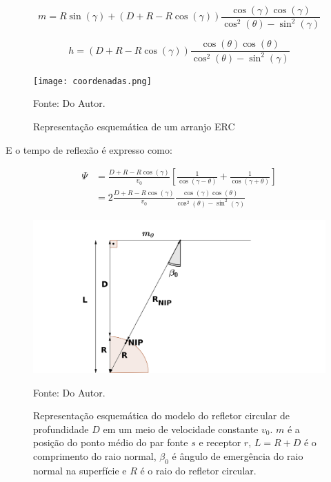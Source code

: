 \begin{equation}
\label{eq:7.1}
 m=R\sin(\gamma)+(D+R-R\cos(\gamma))\frac{\cos(\gamma)\cos(\gamma)}{\cos^2(\theta)-\sin^2(\gamma)}
\end{equation}

\begin{equation}
\label{eq:7.2}
 h=(D+R-R\cos(\gamma))\frac{\cos(\theta)\cos(\theta)}{\cos^2(\theta)-\sin^2(\gamma)}
\end{equation}

\begin{figure}[htb]
\caption{Representação esquemática de um arranjo ERC }
\begin{center}
\texttt{[image: coordenadas.png]}
\vspace{-0.3cm}
\end{center}
\begin{center}
 Fonte: Do Autor.
\end{center}
\label{fig:7.2}
\end{figure}


E o tempo de reflexão é expresso como:

\begin{equation}
\begin{flalign*}
\label{eq:7.3}
 \Psi &=\frac{D+R-R\cos(\gamma)}{v_0} \left[ \frac{1}{\cos(\gamma-\theta)}+\frac{1}{\cos(\gamma+\theta)} \right] \\
 &=2\frac{D+R-R\cos(\gamma)}{v_0}\frac{\cos(\gamma)\cos(\theta)}{\cos^2(\theta)-\sin^2(\gamma)}
\end{flalign*} 
\end{equation}


\begin{figure}[htb]
\caption{Representação esquemática do modelo do refletor circular de profundidade $D$
em um meio de velocidade constante $v_0$.
$m$ é a posição do ponto médio do par fonte $s$ e receptor $r$, $L=R+D$ é o comprimento do raio normal, 
$\beta_0$ é ângulo de emergência
do raio normal na superfície e $R$ é o raio do refletor circular.}
\begin{flushleft}
\includegraphics[scale=0.45]{images/circ_mod.png}
\vspace{-0.3cm}
\end{flushleft}
\begin{center}
 Fonte: Do Autor.
\end{center}
\label{fig:7.3}
\end{figure}

